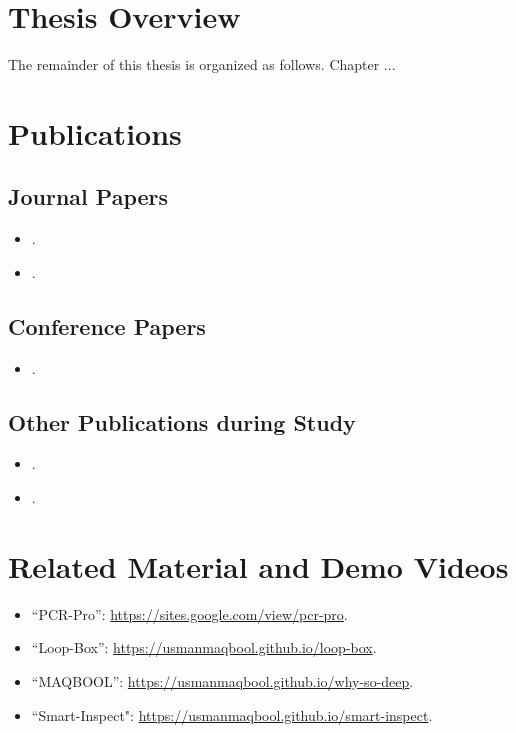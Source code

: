 \section{Thesis Overview}
The remainder of this thesis is organized as follows. Chapter ... \\
\section{Publications}
\nobibliography*
\subsection{Journal Papers}
\begin{itemize}
	\item {}.
	\item {}.
\end{itemize}

\subsection{Conference Papers}
\begin{itemize}
	\item {}.
\end{itemize}
\subsection{Other Publications during Study}
\begin{itemize}
	\item {}.
	\item {}.
\end{itemize}
\section{Related Material and Demo Videos}
\begin{itemize}
\item ``PCR-Pro'': \href{https://sites.google.com/view/pcr-pro}{https://sites.google.com/view/pcr-pro}.
\item ``Loop-Box'': \href{https://usmanmaqbool.github.io/loop-box}{https://usmanmaqbool.github.io/loop-box}.
\item ``MAQBOOL'': \href{https://usmanmaqbool.github.io/why-so-deep}{https://usmanmaqbool.github.io/why-so-deep}.
\item ``Smart-Inspect": \href{https://usmanmaqbool.github.io/smart-inspect}{https://usmanmaqbool.github.io/smart-inspect}.	
\end{itemize}
\newpage
\renewcommand*{\bibname}{\section{References}}%

	
